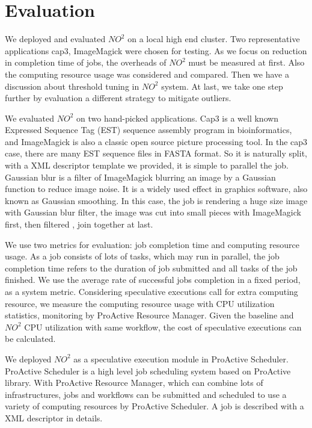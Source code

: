 \section{Evaluation}
We deployed and evaluated $NO^2$ on a local high end cluster. Two representative applications cap3, ImageMagick were chosen for testing. As we focus on reduction in completion time of jobs, the overheads of $NO^2$ must be measured at first. Also the computing resource usage was considered and compared. Then we have a discussion about threshold tuning in $NO^2$ system. At last, we take one step further by evaluation a different strategy to mitigate outliers.

We evaluated $NO^2$ on two hand-picked applications. Cap3 is a well known Expressed Sequence Tag (EST) sequence assembly program in bioinformatics, and ImageMagick is also a classic open source picture processing tool. In the cap3 case, there are many EST sequence files in FASTA format. So it is naturally split, with a XML descriptor template we provided, it is simple to parallel the job. Gaussian blur is a filter of ImageMagick blurring an image by a Gaussian function to reduce image noise. It is a widely used effect in graphics software, also known as Gaussian smoothing. In this case, the job is rendering a huge size image with Gaussian blur filter, the image was cut into small pieces with ImageMagick first, then filtered , join together at last.

We use two metrics for evaluation: job completion time and computing resource usage. As a job consists of lots of tasks, which may run in parallel, the job completion time refers to the duration of job submitted and all tasks of the job finished. We use the average rate of successful jobs completion in a fixed period, as a system metric. Considering speculative executions call for extra computing resource, we measure the computing resource usage with CPU utilization statistics, monitoring by ProActive Resource Manager. Given the baseline and $NO^2$ CPU utilization with same workflow, the cost of speculative executions can be calculated.

We deployed $NO^2$ as a speculative execution module in ProActive Scheduler. ProActive Scheduler is a high level job scheduling system based on ProActive library. With ProActive Resource Manager, which can combine lots of infrastructures, jobs and workflows can be submitted and scheduled to use a variety of computing resources by ProActive Scheduler. A job is described with a XML descriptor in details.

